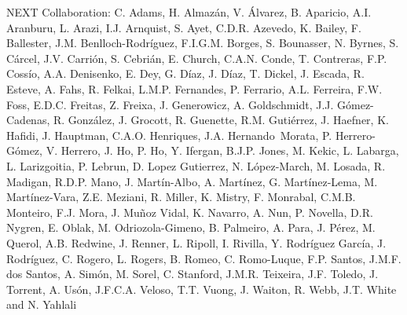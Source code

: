NEXT Collaboration: C. Adams, H. Almaz\'an, V. \'Alvarez, B. Aparicio, A.I. Aranburu, L. Arazi, I.J. Arnquist, S. Ayet, C.D.R. Azevedo, K. Bailey, F. Ballester, J.M. Benlloch-Rodr\'{i}guez, F.I.G.M. Borges, S. Bounasser, N. Byrnes, S. C\'arcel, J.V. Carri\'on, S. Cebri\'an, E. Church, C.A.N. Conde, T. Contreras, F.P. Coss\'io, A.A. Denisenko, E. Dey, G. D\'iaz, J. D\'iaz, T. Dickel, J. Escada, R. Esteve, A. Fahs, R. Felkai, L.M.P. Fernandes, P. Ferrario, A.L. Ferreira, F.W. Foss, E.D.C. Freitas, Z. Freixa, J. Generowicz, A. Goldschmidt, J.J. G\'omez-Cadenas, R. Gonz\'alez, J. Grocott, R. Guenette, R.M. Guti\'errez, J. Haefner, K. Hafidi, J. Hauptman, C.A.O. Henriques, J.A. Hernando~Morata, P. Herrero-G\'omez, V. Herrero, J. Ho, P. Ho, Y. Ifergan, B.J.P. Jones, M. Kekic, L. Labarga, L. Larizgoitia, P. Lebrun, D. Lopez Gutierrez, N. L\'opez-March, M. Losada, R. Madigan, R.D.P. Mano, J. Mart\'in-Albo, A. Mart\'inez, G. Mart\'inez-Lema, M. Mart\'inez-Vara, Z.E. Meziani, R. Miller, K. Mistry, F. Monrabal, C.M.B. Monteiro, F.J. Mora, J. Mu\~noz Vidal, K. Navarro, A. Nun, P. Novella, D.R. Nygren, E. Oblak, M. Odriozola-Gimeno, B. Palmeiro, A. Para, J. P\'erez, M. Querol, A.B. Redwine, J. Renner, L. Ripoll, I. Rivilla, Y. Rodr\'iguez Garc\'ia, J. Rodr\'iguez, C. Rogero, L. Rogers, B. Romeo, C. Romo-Luque, F.P. Santos, J.M.F. dos Santos, A. Sim\'on, M. Sorel, C. Stanford, J.M.R. Teixeira, J.F. Toledo, J. Torrent, A. Us\'on, J.F.C.A. Veloso, T.T. Vuong, J. Waiton, R. Webb, J.T. White and N. Yahlali